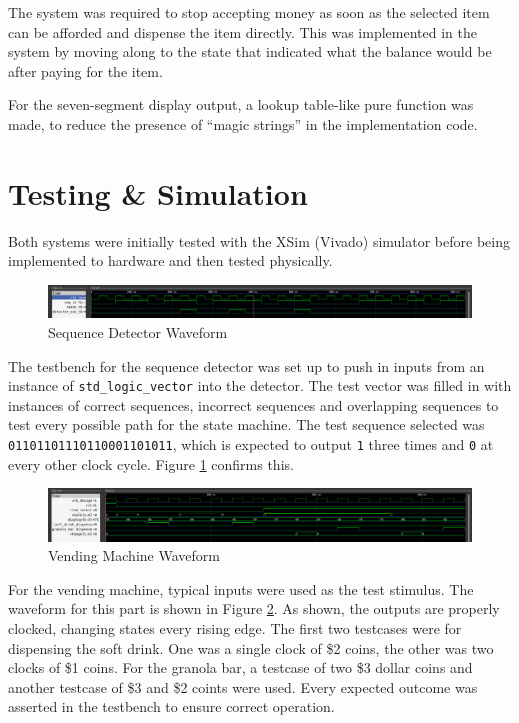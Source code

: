 \documentclass[12pt]{article}
\begin{document}
The system was required to stop accepting money as soon as the selected item can be afforded and dispense the item directly. This was implemented in the system by moving along to the state that indicated what the balance would be after paying for the item.

For the seven-segment display output, a lookup table-like pure function was made, to reduce the presence of ``magic strings'' in the implementation code.

\section{Testing \& Simulation}

Both systems were initially tested with the XSim (Vivado) simulator before being implemented to hardware and then tested physically.

\begin{figure}[h]
  \includegraphics[width=\linewidth]{waveform-sequence.png}
  \caption{Sequence Detector Waveform}
  \label{fig:waveform-sequence}
\end{figure}

The testbench for the sequence detector was set up to push in inputs from an instance of \verb|std_logic_vector| into the detector. The test vector was filled in with instances of correct sequences, incorrect sequences and overlapping sequences to test every possible path for the state machine.
The test sequence selected was \verb|01101101110110001101011|, which is expected to output \verb|1| three times and \verb|0| at every other clock cycle. Figure \ref{fig:waveform-sequence} confirms this.

\begin{figure}[h]
  \includegraphics[width=\linewidth]{waveform-vending.png}
  \caption{Vending Machine Waveform}
  \label{fig:waveform-vending}
\end{figure}

For the vending machine, typical inputs were used as the test stimulus. The waveform for this part is shown in Figure \ref{fig:waveform-vending}. As shown, the outputs are properly clocked, changing states every rising edge. The first two testcases were for dispensing the soft drink. One was a single clock of \$2 coins, the other was two clocks of \$1 coins. For the granola bar, a testcase of two \$3 dollar coins and another testcase of \$3 and \$2 coints were used. Every expected outcome was asserted in the testbench to ensure correct operation.
\end{document}
